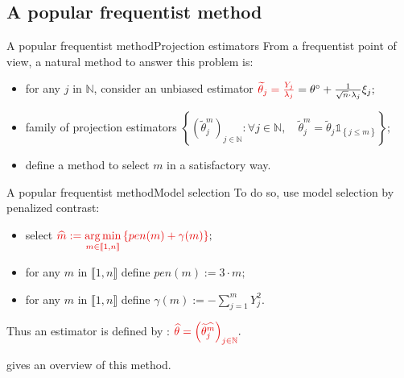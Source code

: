 \documentclass[10pt]{beamer}
\DeclareMathOperator*{\argmin}{arg\,min}
\begin{document}
\subsection{A popular frequentist method}
\begin{frame}{A popular frequentist method}{Projection estimators}
From a frequentist point of view, a natural method to answer this problem is:

\bigskip

\begin{itemize}
\setlength\itemsep{2em}
\item<1-> for any $j$ in $\mathbb{N}$, consider an unbiased estimator $\textcolor{red!90!black}{\widetilde{\theta}_{j} = \frac{Y_{j}}{\lambda_{j}}} = \theta^{\circ} + \frac{1}{\sqrt{n}\cdot\lambda_{j}} \xi_{j};$
\item<2-> family of projection estimators $\left\{\left(\widetilde{\theta}^{m}_{j}\right)_{j \in \mathbb{N}} : \forall j \in \mathbb{N}, \quad \widetilde{\theta}^{m}_{j} = \widetilde{\theta}_{j} \mathds{1}_{\left\{j \leq m\right\}} \right\};$
\item<3-> define a method to select $m$ in a satisfactory way.
\end{itemize}
\end{frame}

\begin{frame}{A popular frequentist method}{Model selection}
To do so, use model selection by penalized contrast:

\medskip

\begin{itemize}
\setlength\itemsep{1em}
\item<1-> select $\textcolor{red!90!black}{\widehat{m} := \argmin\limits_{m \in \llbracket 1, n\rrbracket}\left\{pen(m) + \gamma(m)\right\}};$
\item<2-> for any $m$ in $\llbracket 1, n\rrbracket$ define $pen(m) := 3 \cdot m;$
\item<3-> for any $m$ in $\llbracket 1, n\rrbracket$ define $\gamma(m) := -\sum\limits_{j = 1}^{m} Y_{j}^{2}.$
\end{itemize}

\medskip

Thus an estimator is defined by : $\textcolor{red!90!black}{\widehat{\theta} = \left(\widetilde{\theta}^{\widehat{m}}_{j}\right)_{j \in \mathbb{N}}}.$

\medskip

\textbf{\citet{PM}} gives an overview of this method.
\end{frame}
\end{document}
